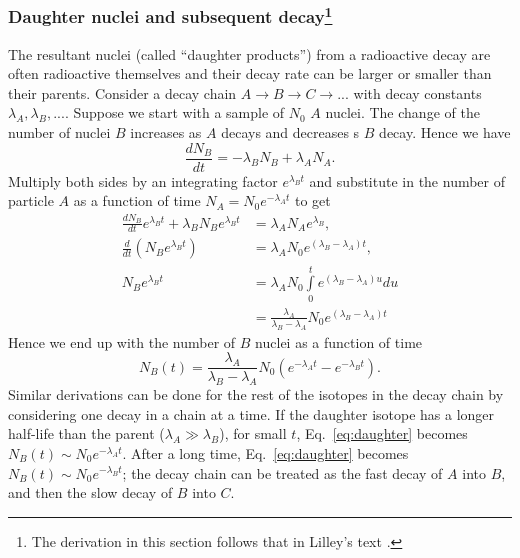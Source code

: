 \documentclass[nofootinbib,preprint,aps]{revtex4-1}
\begin{document}
        \subsubsection{Daughter nuclei and subsequent decay\footnote{The derivation in this section follows that in
        Lilley's text \cite[chapt. 1.5]{l01}.}}
        The resultant nuclei (called ``daughter products'') from a radioactive decay are often radioactive
        themselves and their decay rate can be larger or smaller than their parents. Consider a decay chain
        $A\rightarrow B \rightarrow C \rightarrow ...$ with decay constants $\lambda_A, \lambda_B,...$. Suppose
        we start with a sample of $N_0$ $A$ nuclei. The change of the number of nuclei $B$ increases as $A$
        decays and decreases s $B$ decay. Hence we have
        \begin{equation}
            \frac{dN_B}{dt} = -\lambda_B N_B + \lambda_A N_A.
        \end{equation}
        Multiply both sides by an integrating factor $e^{\lambda_B t}$ and substitute in the number of particle
        $A$ as a function of time $N_A=N_0 e^{-\lambda_A t}$ to get
        \begin{align}
            \frac{dN_B}{dt}e^{\lambda_B t} + \lambda_B N_B e^{\lambda_B t} &= \lambda_A N_A e^{\lambda_B},\nonumber\\
            \frac{d}{dt} (N_B e^{\lambda_B t}) &= \lambda_A N_0 e^{(\lambda_B-\lambda_A)t}, \nonumber\\
            N_B e^{\lambda_B t} &= \lambda_A N_0 \int\limits_0^t e^{(\lambda_B - \lambda_A)u} du \nonumber\\
                                &= \frac{\lambda_A}{\lambda_B-\lambda_A}N_0 e^{(\lambda_B - \lambda_A)t}
        \end{align}
        Hence we end up with the number of $B$ nuclei as a function of time
        \begin{equation}
            N_B(t)=\frac{\lambda_A}{\lambda_B-\lambda_A}N_0(e^{-\lambda_A t} - e^{-\lambda_B t}).
            \label{eq:daughter}
        \end{equation}
        Similar derivations can be done for the rest of the isotopes in the decay chain by considering
        one decay in a chain at a time. If the daughter isotope has a longer half-life than the parent
        ($\lambda_A \gg \lambda_B$), for small $t$, Eq.~\ref{eq:daughter} becomes
        $N_B(t)\sim N_0 e^{-\lambda_A t}$. After a long time,
        Eq.~\ref{eq:daughter} becomes $N_B(t) \sim N_0 e^{-\lambda_B t}$; the decay
        chain can be treated as the fast decay of $A$ into $B$, and then the slow decay of $B$
        into $C$.
        
\end{document}
